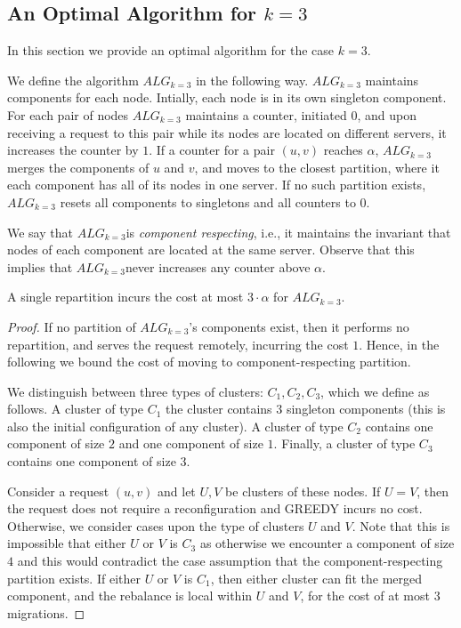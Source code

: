 \documentclass[manuscript,screen=true]{acmart}
\newcommand{\TAlg}{{\ensuremath{ALG_{k=3}}}} %
\newcommand\maciek[1]{\color{brown}\textbf{\\ Maciek: #1}\color{black}}
\begin{document}
\begin{appendix}
  \section{An Optimal Algorithm for $k=3$}

  In this section we provide an optimal algorithm for the case $k=3$.
  
  We define the algorithm \TAlg{} in the following way.
  \TAlg{} maintains components for each node.
  Intially, each node is in its own singleton component.
  For each pair of nodes \TAlg{} maintains a counter, initiated $0$, and upon receiving a request to this pair while its nodes are located on different servers, it increases the counter by $1$.
  If a counter for a pair $(u,v)$ reaches $\alpha$, \TAlg{} merges the components of $u$ and $v$, and moves to the closest partition, where it each component has all of its nodes in one server.
  If no such partition exists, \TAlg{} resets all components to singletons and all counters to $0$.


  We say that \TAlg is \emph{component respecting}, i.e., it maintains the invariant that nodes of each component are located at the same server.
  Observe that this implies that \TAlg never increases any counter above $\alpha$.
  
  \begin{lemma}
    \label{lem:1req}
    A single repartition incurs the cost at most $3\cdot\alpha$ for \TAlg.
  \end{lemma}
  
  \begin{proof}
    If no partition of \TAlg's components exist, then it performs no repartition, and serves the request remotely, incurring the cost $1$.
    Hence, in the following we bound the cost of moving to component-respecting partition.
  
    We distinguish between three types of clusters: $C_1, C_2, C_3$,
    which we define as follows.
    A cluster of type $C_1$ the cluster contains $3$ singleton components (this is also the initial configuration of any cluster).
    A cluster of type $C_2$  contains one component of size $2$ and one component of size $1$.
    Finally, a cluster of type $C_3$  contains one component of size $3$.
    
      Consider a request $(u, v)$ and let $U, V$ be clusters of these nodes.
      If $U=V$, then the request does not require a reconfiguration and GREEDY incurs no cost.
      Otherwise, we consider cases upon the type of clusters $U$ and $V$.
      Note that this is impossible that either $U$ or $V$ is $C_3$ as otherwise we encounter a component of size $4$ and this would contradict the case assumption that the component-respecting partition exists.
      If either $U$ or $V$ is $C_1$, then either cluster can fit the merged component, and the rebalance is local within $U$ and $V$, for the cost of at most $3$ migrations.
    

\end{proof}
\end{appendix}
\end{document}
